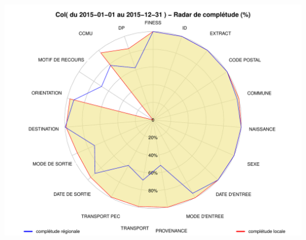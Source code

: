 \documentclass[]{article}
\begin{document}
\includegraphics{completude_files/figure-latex/finess-12.pdf}
\end{document}
